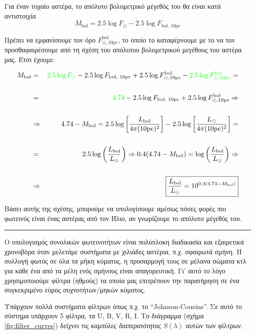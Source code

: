 Για έναν τυχαίο αστέρα, το απόλυτο βολομετρικό μέγεθός του θα είναι κατά αντιστοιχία
$$M_{\text{bol}} = 2.5 \log F_{\odot} - 2.5 \log F_{\text{bol, 10pc}}$$

Πρέπει να εμφανίσουμε τον όρο $F_{\odot, \text{10pc}}^{\text{bol}}$, το οποίο το καταφέρνουμε με το να τον προσθαφαιρέσουμε από τη σχέση του απόλυτου βολομετρικού μεγέθους του αστέρα μας. Έτσι έχουμε:

\begin{eqnarray*}
    M_{\text{bol}} &=& {\color{green} 2.5 \log F_{\odot}} - 2.5 \log F_{\text{bol, 10pc}} + 2.5 \log F_{\odot, \text{10pc}}^{\text{bol}} - {\color{green} 2.5 \log F_{\odot, \text{10pc}}^{\text{bol}}} = \\\\
    &=& {\color{green}4.74} - 2.5 \log F_{\text{bol, 10pc}} + 2.5 \log F_{\odot, \text{10pc}}^{\text{bol}} \Rightarrow \\\\
    &\Rightarrow & 4.74 - M_{\text{bol}} = 2.5 \log \left[ \frac{L_{\text{bol}}}{4\pi (\text{10pc})^2} \right] - 2.5 \log \left[ \frac{L_{\odot}}{4\pi (\text{10pc})^2} \right] = \\\\
    &=& 2.5 \log \left( \frac{L_{\text{bol}}}{L_{\odot}} \right) \Rightarrow 0.4(4.74 - M_{\text{bol}}) = \log \left( \frac{L_{\text{bol}}}{L_{\odot}} \right) \Rightarrow \\\\
    &\Rightarrow & \boxed{\frac{L_{\text{bol}}}{L_{\odot}} = 10^{0.4(4.74 - M_{\text{bol}})}}
\end{eqnarray*}

Βάσει αυτής της σχέσης, μπορούμε να υπολογίσουμε αμέσως πόσες φορές πιο φωτεινός είναι ένας αστέρας από τον Ήλιο, αν γνωρίζουμε το απόλυτο μέγεθός του. \\
\hrule 

Ο υπολογισμός συνολικών φωτεινοτήτων είναι πολύπλοκη διαδικασία και εξαιρετικά χρονοβόρα όταν μελετάμε συστήματα με χιλιάδες αστέρια, π.χ. σφαιρωτά σμήνη. Η συλλογή φωτός σε όλα τα μήκη κύματος, η προσαρμογή τους σε μέλανα σώματα κτλ για κάθε ένα από τα μέλη ενός σμήνους είναι απαγορευτική.
Γι' αυτό το λόγο χρησιμοποιούμε φίλτρα (ηθμούς) τα οποία μας επιτρέπουν την παρατήρηση σε ένα συγκεκριμένο εύρος συχνοτήτων/μηκών κύματος.

Υπάρχουν πολλά συστήματα φίλτρων όπως π.χ. το ``Johnson-Cousins''. Σε αυτό το σύστημα υπάρχουν 5 φίλτρα, τα U, B, V, R, I. Το διάγραμμα (σχήμα \ref{fig:filter_curves}) δείχνει τις \textit{καμπύλες διαπερατότητας} $S(\lambda)$ αυτών των φίλτρων.

